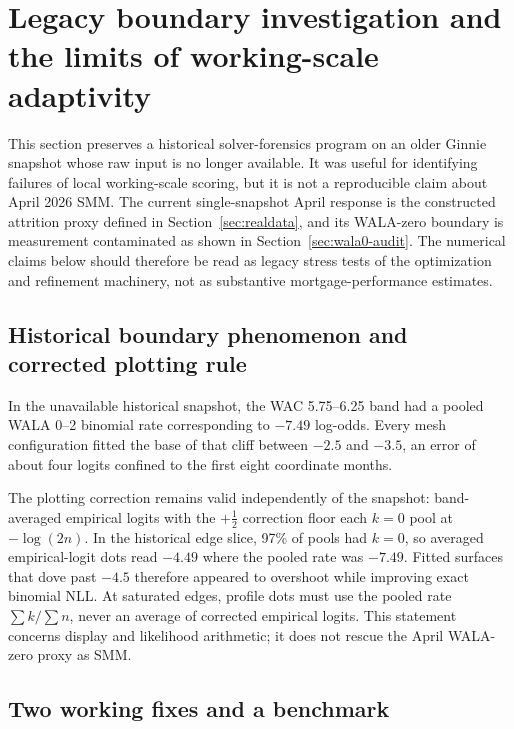 \documentclass[11pt]{article}
\begin{document}
\section{Legacy boundary investigation and the limits of working-scale adaptivity}\label{sec:boundary}

This section preserves a historical solver-forensics program on an older
Ginnie snapshot whose raw input is no longer available. It was useful for
identifying failures of local working-scale scoring, but it is not a
reproducible claim about April 2026 SMM. The current single-snapshot April
response is the constructed attrition proxy defined in
Section~\ref{sec:realdata}, and its WALA-zero boundary is measurement
contaminated as shown in Section~\ref{sec:wala0-audit}. The numerical claims
below should therefore be read as legacy stress tests of the optimization and
refinement machinery, not as substantive mortgage-performance estimates.

\subsection{Historical boundary phenomenon and corrected plotting rule}

In the unavailable historical snapshot, the WAC 5.75--6.25 band had a pooled
WALA 0--2 binomial rate corresponding to $-7.49$ log-odds. Every mesh
configuration fitted the base of that cliff between $-2.5$ and $-3.5$, an
error of about four logits confined to the first eight coordinate months.

The plotting correction remains valid independently of the snapshot:
band-averaged empirical logits with the $+\tfrac12$ correction floor each
$k=0$ pool at $-\log(2n)$. In the historical edge slice, 97\% of pools had
$k=0$, so averaged empirical-logit dots read $-4.49$ where the pooled rate was
$-7.49$. Fitted surfaces that dove past $-4.5$ therefore appeared to overshoot
while improving exact binomial NLL. At saturated edges, profile dots must use
the pooled rate $\sum k/\sum n$, never an average of corrected empirical
logits. This statement concerns display and likelihood arithmetic; it does not
rescue the April WALA-zero proxy as SMM.

\subsection{Two working fixes and a benchmark}
\end{document}
